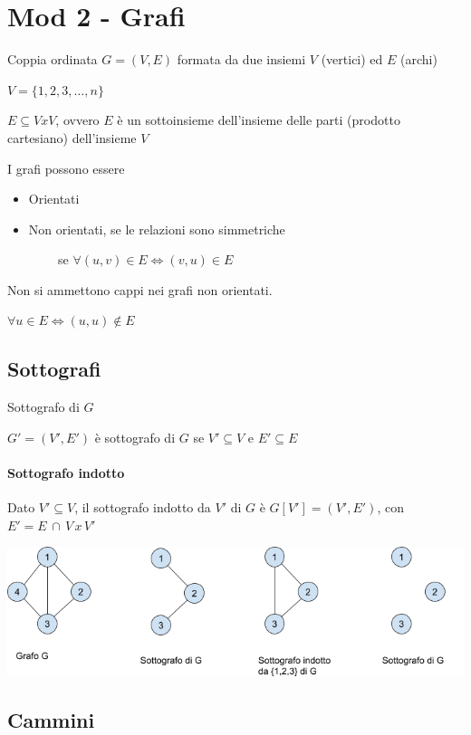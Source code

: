 \documentclass{article}
\providecommand{\tightlist}{%
  \setlength{\itemsep}{0pt}\setlength{\parskip}{0pt}}
\let\oldparagraph\paragraph
\renewcommand{\paragraph}[1]{\oldparagraph{#1}\mbox{}}
\begin{document}
\section{Mod 2 - Grafi}

{Coppia ordinata $G=(V,E)$ formata da due insiemi $V$ (vertici) ed $E$ (archi)}

$V = \{1,2,3,\ldots,n\}$

{$E \subseteq VxV$, ovvero $E$ è un sottoinsieme dell'insieme delle parti (prodotto cartesiano) dell'insieme $V$}

{I grafi possono essere}

\begin{itemize}
\tightlist
\item
  {Orientati}
\item
  {Non orientati, se le relazioni sono simmetriche}
\end{itemize}

{~~~~~~~~se $\forall(u,v) \in E \iff (v,u) \in E$}

{Non si ammettono cappi nei grafi non orientati.}

$\forall u \in E \iff (u,u) \notin E$

\subsection{Sottografi}

{Sottografo di $G$}

{$G'=(V',E')$ è sottografo di $G$ se $V'\subseteq V$ e $E'\subseteq E$}

\paragraph{Sottografo  indotto}

{Dato $V' \subseteq V$, il sottografo indotto da $V'$ di $G$ è $G[V']=(V',E')$, con $E' = E\,\cap\,V\,x\,V'$}

\includegraphics{images/image534.png}

\subsection{Cammini}
\end{document}
